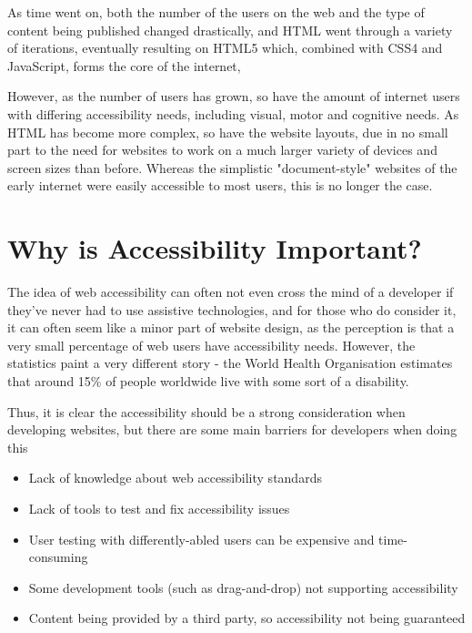 \documentclass[ %
                    author={Aleena Baig},
                supervisor={Dr Simon Lock},
                    degree={BSc},
                     title={On Making Web Accessible Graphs},
                  subtitle={},
                      year={2019} ]{dissertation}
\begin{document}
As time went on, both the number of the users on the web and the type of content being published changed drastically, and HTML went through a variety of iterations, eventually resulting on HTML5 which, combined with CSS4 and JavaScript, forms the core of the internet,

However, as the number of users has grown, so have the amount of internet users with differing accessibility needs, including visual, motor and cognitive needs. As HTML has become more complex, so have the website layouts, due in no small part to the need for websites to work on a much larger variety of devices and screen sizes than before. Whereas the simplistic "document-style" websites of the early internet were easily accessible to most users, this is no longer the case.


\section{Why is Accessibility Important?}

The idea of web accessibility can often not even cross the mind of a developer if they've never had to use assistive technologies, and for those who do consider it, it can often seem like a minor part of website design, as the perception is that a very small percentage of web users have accessibility needs.
However, the statistics paint a very different story - the World Health Organisation estimates that around 15\% of people worldwide live with some sort of a disability. \cite{WHOdisability}

Thus, it is clear the accessibility should be a strong consideration when developing websites, but there are some main barriers for developers when doing this

\begin{itemize}
    \item Lack of knowledge about web accessibility standards
    \item Lack of tools to test and fix accessibility issues
    \item User testing with differently-abled users can be expensive and time-consuming
    \item Some development tools (such as drag-and-drop) not supporting accessibility
    \item Content being provided by a third party, so accessibility not being guaranteed
\end{itemize}
\end{document}
